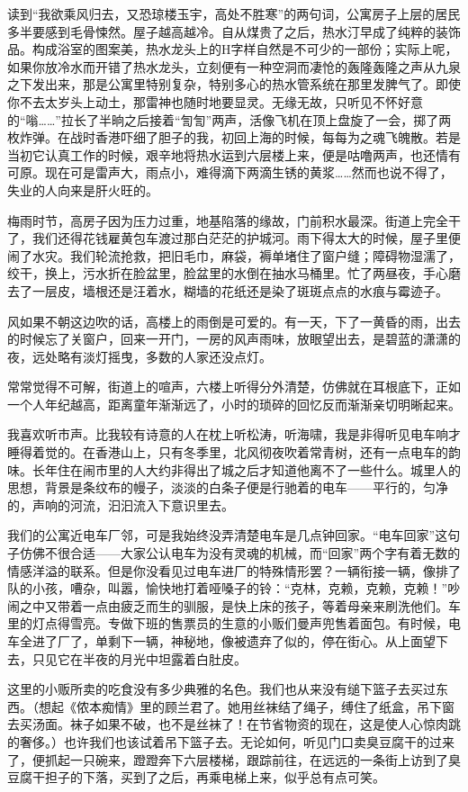 \par 读到“我欲乘风归去，又恐琼楼玉宇，高处不胜寒”的两句词，公寓房子上层的居民多半要感到毛骨悚然。屋子越高越冷。自从煤贵了之后，热水汀早成了纯粹的装饰品。构成浴室的图案美，热水龙头上的H字样自然是不可少的一部份；实际上呢，如果你放冷水而开错了热水龙头，立刻便有一种空洞而凄怆的轰隆轰隆之声从九泉之下发出来，那是公寓里特别复杂，特别多心的热水管系统在那里发脾气了。即使你不去太岁头上动土，那雷神也随时地要显灵。无缘无故，只听见不怀好意的“嗡……”拉长了半晌之后接着“訇訇”两声，活像飞机在顶上盘旋了一会，掷了两枚炸弹。在战时香港吓细了胆子的我，初回上海的时候，每每为之魂飞魄散。若是当初它认真工作的时候，艰辛地将热水运到六层楼上来，便是咕噜两声，也还情有可原。现在可是雷声大，雨点小，难得滴下两滴生锈的黄浆……然而也说不得了，失业的人向来是肝火旺的。
\par 梅雨时节，高房子因为压力过重，地基陷落的缘故，门前积水最深。街道上完全干了，我们还得花钱雇黄包车渡过那白茫茫的护城河。雨下得太大的时候，屋子里便闹了水灾。我们轮流抢救，把旧毛巾，麻袋，褥单堵住了窗户缝；障碍物湿濡了，绞干，换上，污水折在脸盆里，脸盆里的水倒在抽水马桶里。忙了两昼夜，手心磨去了一层皮，墙根还是汪着水，糊墙的花纸还是染了斑斑点点的水痕与霉迹子。
\par 风如果不朝这边吹的话，高楼上的雨倒是可爱的。有一天，下了一黄昏的雨，出去的时候忘了关窗户，回来一开门，一房的风声雨味，放眼望出去，是碧蓝的潇潇的夜，远处略有淡灯摇曳，多数的人家还没点灯。
\par 常常觉得不可解，街道上的喧声，六楼上听得分外清楚，仿佛就在耳根底下，正如一个人年纪越高，距离童年渐渐远了，小时的琐碎的回忆反而渐渐亲切明晰起来。
\par 我喜欢听市声。比我较有诗意的人在枕上听松涛，听海啸，我是非得听见电车响才睡得着觉的。在香港山上，只有冬季里，北风彻夜吹着常青树，还有一点电车的韵味。长年住在闹市里的人大约非得出了城之后才知道他离不了一些什么。城里人的思想，背景是条纹布的幔子，淡淡的白条子便是行驰着的电车——平行的，匀净的，声响的河流，汩汩流入下意识里去。
\par 我们的公寓近电车厂邻，可是我始终没弄清楚电车是几点钟回家。“电车回家”这句子仿佛不很合适——大家公认电车为没有灵魂的机械，而“回家”两个字有着无数的情感洋溢的联系。但是你没看见过电车进厂的特殊情形罢？一辆衔接一辆，像排了队的小孩，嘈杂，叫嚣，愉快地打着哑嗓子的铃：“克林，克赖，克赖，克赖！”吵闹之中又带着一点由疲乏而生的驯服，是快上床的孩子，等着母亲来刷洗他们。车里的灯点得雪亮。专做下班的售票员的生意的小贩们曼声兜售着面包。有时候，电车全进了厂了，单剩下一辆，神秘地，像被遗弃了似的，停在街心。从上面望下去，只见它在半夜的月光中坦露着白肚皮。
\par 这里的小贩所卖的吃食没有多少典雅的名色。我们也从来没有缒下篮子去买过东西。（想起《侬本痴情》里的顾兰君了。她用丝袜结了绳子，缚住了纸盒，吊下窗去买汤面。袜子如果不破，也不是丝袜了！在节省物资的现在，这是使人心惊肉跳的奢侈。）也许我们也该试着吊下篮子去。无论如何，听见门口卖臭豆腐干的过来了，便抓起一只碗来，蹬蹬奔下六层楼梯，跟踪前往，在远远的一条街上访到了臭豆腐干担子的下落，买到了之后，再乘电梯上来，似乎总有点可笑。
